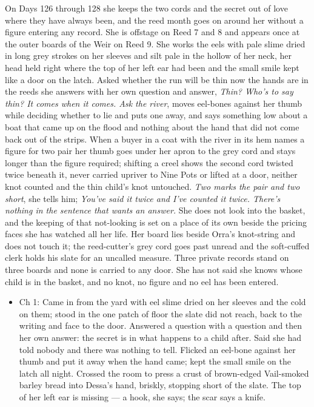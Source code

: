 \documentclass{design/chronicle}
\begin{document}
{On Days 126 through 128 she keeps the two cords and the secret out of love where they have always been, and the reed month goes on around her without a figure entering any record. She is offstage on Reed 7 and 8 and appears once at the outer boards of the Weir on Reed 9. She works the eels with pale slime dried in long grey strokes on her sleeves and silt pale in the hollow of her neck, her head held right where the top of her left ear had been and the small smile kept like a door on the latch. Asked whether the run will be thin now the hands are in the reeds she answers with her own question and answer, \emph{Thin? Who’s to say thin? It comes when it comes. Ask the river}, moves eel-bones against her thumb while deciding whether to lie and puts one away, and says something low about a boat that came up on the flood and nothing about the hand that did not come back out of the strips. When a buyer in a coat with the river in its hem names a figure for two pair her thumb goes under her apron to the grey cord and stays longer than the figure required; shifting a creel shows the second cord twisted twice beneath it, never carried upriver to Nine Pots or lifted at a door, neither knot counted and the thin child’s knot untouched. \emph{Two marks the pair and two short}, she tells him; \emph{You’ve said it twice and I’ve counted it twice. There’s nothing in the sentence that wants an answer.} She does not look into the basket, and the keeping of that not-looking is set on a place of its own beside the pricing faces she has watched all her life. Her board lies beside Orra’s knot-string and does not touch it; the reed-cutter’s grey cord goes past unread and the soft-cuffed clerk holds his slate for an uncalled measure. Three private records stand on three boards and none is carried to any door. She has not said she knows whose child is in the basket, and no knot, no figure and no eel has been entered.

\begin{itemize}[leftmargin=1.4em,itemsep=1pt,topsep=3pt,parsep=0pt]

\item Ch 1: Came in from the yard with eel slime dried on her sleeves and the cold on them; stood in the one patch of floor the slate did not reach, back to the writing and face to the door. Answered a question with a question and then her own answer: the secret is in what happens to a child after. Said she had told nobody and there was nothing to tell. Flicked an eel-bone against her thumb and put it away when the hand came; kept the small smile on the latch all night. Crossed the room to press a crust of brown-edged Vail-smoked barley bread into Dessa’s hand, briskly, stopping short of the slate. The top of her left ear is missing --- a hook, she says; the scar says a knife.


\end{itemize}}
\end{document}

